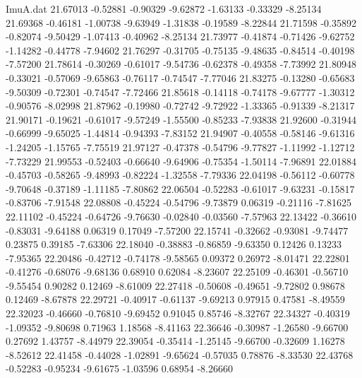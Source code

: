 \begin{filecontents}{ImuA.dat}
  21.67013   -0.52881   -0.90329   -9.62872   -1.63133   -0.33329   -8.25134
  21.69368   -0.46181   -1.00738   -9.63949   -1.31838   -0.19589   -8.22844
  21.71598   -0.35892   -0.82074   -9.50429   -1.07413   -0.40962   -8.25134
  21.73977   -0.41874   -0.71426   -9.62752   -1.14282   -0.44778   -7.94602
  21.76297   -0.31705   -0.75135   -9.48635   -0.84514   -0.40198   -7.57200
  21.78614   -0.30269   -0.61017   -9.54736   -0.62378   -0.49358   -7.73992
  21.80948   -0.33021   -0.57069   -9.65863   -0.76117   -0.74547   -7.77046
  21.83275   -0.13280   -0.65683   -9.50309   -0.72301   -0.74547   -7.72466
  21.85618   -0.14118   -0.74178   -9.67777   -1.30312   -0.90576   -8.02998
  21.87962   -0.19980   -0.72742   -9.72922   -1.33365   -0.91339   -8.21317
  21.90171   -0.19621   -0.61017   -9.57249   -1.55500   -0.85233   -7.93838
  21.92600   -0.31944   -0.66999   -9.65025   -1.44814   -0.94393   -7.83152
  21.94907   -0.40558   -0.58146   -9.61316   -1.24205   -1.15765   -7.75519
  21.97127   -0.47378   -0.54796   -9.77827   -1.11992   -1.12712   -7.73229
  21.99553   -0.52403   -0.66640   -9.64906   -0.75354   -1.50114   -7.96891
  22.01884   -0.45703   -0.58265   -9.48993   -0.82224   -1.32558   -7.79336
  22.04198   -0.56112   -0.60778   -9.70648   -0.37189   -1.11185   -7.80862
  22.06504   -0.52283   -0.61017   -9.63231   -0.15817   -0.83706   -7.91548
  22.08808   -0.45224   -0.54796   -9.73879    0.06319   -0.21116   -7.81625
  22.11102   -0.45224   -0.64726   -9.76630   -0.02840   -0.03560   -7.57963
  22.13422   -0.36610   -0.83031   -9.64188    0.06319    0.17049   -7.57200
  22.15741   -0.32662   -0.93081   -9.74477    0.23875    0.39185   -7.63306
  22.18040   -0.38883   -0.86859   -9.63350    0.12426    0.13233   -7.95365
  22.20486   -0.42712   -0.74178   -9.58565    0.09372    0.26972   -8.01471
  22.22801   -0.41276   -0.68076   -9.68136    0.68910    0.62084   -8.23607
  22.25109   -0.46301   -0.56710   -9.55454    0.90282    0.12469   -8.61009
  22.27418   -0.50608   -0.49651   -9.72802    0.98678    0.12469   -8.67878
  22.29721   -0.40917   -0.61137   -9.69213    0.97915    0.47581   -8.49559
  22.32023   -0.46660   -0.76810   -9.69452    0.91045    0.85746   -8.32767
  22.34327   -0.40319   -1.09352   -9.80698    0.71963    1.18568   -8.41163
  22.36646   -0.30987   -1.26580   -9.66700    0.27692    1.43757   -8.44979
  22.39054   -0.35414   -1.25145   -9.66700   -0.32609    1.16278   -8.52612
  22.41458   -0.44028   -1.02891   -9.65624   -0.57035    0.78876   -8.33530
  22.43768   -0.52283   -0.95234   -9.61675   -1.03596    0.68954   -8.26660

\end{filecontents}
